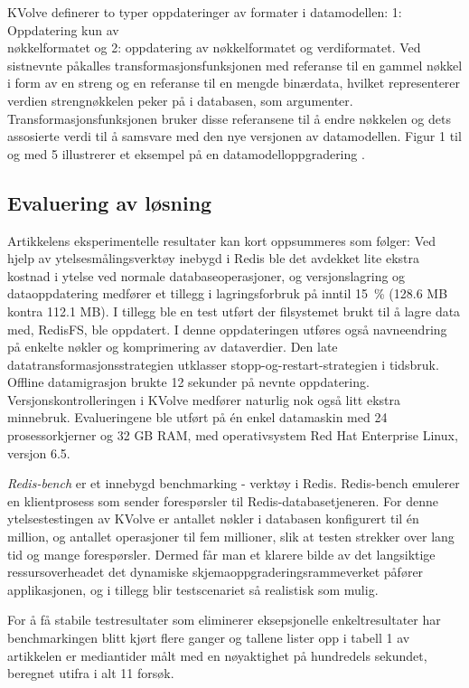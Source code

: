 KVolve definerer to typer oppdateringer av formater i datamodellen: 1: Oppdatering kun av \\ nøkkelformatet og 2: oppdatering av nøkkelformatet og verdiformatet. Ved sistnevnte påkalles transformasjonsfunksjonen med referanse til en gammel nøkkel i form av en streng og en referanse til en mengde binærdata, hvilket representerer verdien strengnøkkelen peker på i databasen, som argumenter. Transformasjonsfunksjonen bruker disse referansene til å endre nøkkelen og dets assosierte verdi til å samsvare med den nye versjonen av datamodellen. Figur 1 til og med 5 illustrerer et eksempel på en datamodelloppgradering \citep{saur2016}.

\subsection{Evaluering av løsning}
Artikkelens eksperimentelle resultater kan kort oppsummeres som følger: Ved hjelp av ytelsesmålingsverktøy inebygd i Redis ble det avdekket lite ekstra kostnad i ytelse ved normale databaseoperasjoner, og versjonslagring og dataoppdatering medfører et tillegg i lagringsforbruk på inntil 15~\% (128.6 MB kontra 112.1 MB). I tillegg ble en test utført der filsystemet brukt til å lagre data med, RedisFS, ble oppdatert. I denne oppdateringen utføres også navneendring på enkelte nøkler og komprimering av dataverdier. Den late datatransformasjonsstrategien utklasser stopp-og-restart-strategien i tidsbruk. Offline datamigrasjon brukte 12 sekunder på nevnte oppdatering. Versjonskontrolleringen i KVolve medfører naturlig nok også litt ekstra minnebruk. Evalueringene ble utført på én enkel datamaskin med 24 prosessorkjerner og 32 GB RAM, med operativsystem Red Hat Enterprise Linux, versjon 6.5.

\emph{Redis-bench} er et innebygd benchmarking - verktøy i Redis. Redis-bench emulerer en klientprosess som sender forespørsler til Redis-databasetjeneren. For denne ytelsestestingen av KVolve er antallet nøkler i databasen konfigurert til én million, og antallet operasjoner til fem millioner, slik at testen strekker over lang tid og mange forespørsler. Dermed får man et klarere bilde av det langsiktige ressursoverheadet det dynamiske skjemaoppgraderingsrammeverket påfører applikasjonen, og i tillegg blir testscenariet så realistisk som mulig.

For å få stabile testresultater som eliminerer eksepsjonelle enkeltresultater har benchmarkingen blitt kjørt flere ganger og tallene \cite{saur2016} lister opp i tabell 1 av artikkelen er mediantider målt med en nøyaktighet på hundredels sekundet, beregnet utifra i alt 11 forsøk.

